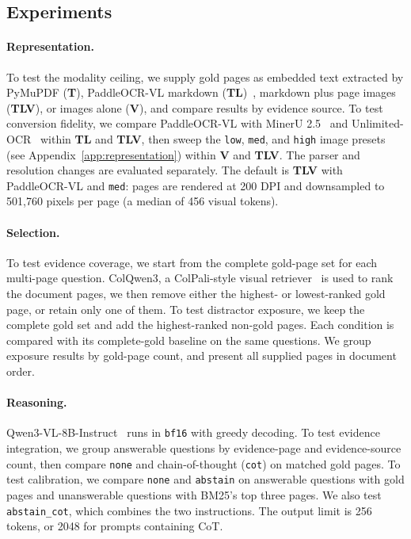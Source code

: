 \documentclass[11pt]{article}
\begin{document}
\subsection{Experiments}
\label{sec:experiment_design}

\paragraph{Representation.}
To test the modality ceiling, we supply gold pages as embedded text extracted by PyMuPDF (\textbf{T}), PaddleOCR-VL markdown (\textbf{TL})~\citep{cui2025paddleocr}, markdown plus page images (\textbf{TLV}), or images alone (\textbf{V}), and compare results by evidence source. To test conversion fidelity, we compare PaddleOCR-VL with MinerU 2.5~\citep{niu2026mineru2} and Unlimited-OCR~\citep{yin2026unlimited} within \textbf{TL} and \textbf{TLV}, then sweep the \texttt{low}, \texttt{med}, and \texttt{high} image presets (see Appendix~\ref{app:representation}) within \textbf{V} and \textbf{TLV}. The parser and resolution changes are evaluated separately. The default is \textbf{TLV} with PaddleOCR-VL and \texttt{med}: pages are rendered at 200 DPI and downsampled to 501,760 pixels per page (a median of 456 visual tokens). 

\paragraph{Selection.}
To test evidence coverage, we start from the complete gold-page set for each multi-page question. ColQwen3, a ColPali-style visual retriever~\citep{faysse2025colpali} is used to rank the document pages, we then remove either the highest- or lowest-ranked gold page, or retain only one of them. To test distractor exposure, we keep the complete gold set and add the highest-ranked non-gold pages. Each condition is compared with its complete-gold baseline on the same questions. We group exposure results by gold-page count, and present all supplied pages in document order.

\paragraph{Reasoning.}
Qwen3-VL-8B-Instruct~\citep{team2025qwen3} runs in \texttt{bf16} with greedy decoding. To test evidence integration, we group answerable questions by evidence-page and evidence-source count, then compare \texttt{none} and chain-of-thought (\texttt{cot}) on matched gold pages. To test calibration, we compare \texttt{none} and \texttt{abstain} on answerable questions with gold pages and unanswerable questions with BM25's top three pages. We also test \texttt{abstain\_cot}, which combines the two instructions. The output limit is 256 tokens, or 2048 for prompts containing CoT.
\end{document}
